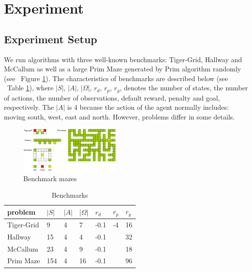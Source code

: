 \documentclass{article}
\begin{document}
\section{Experiment}

\subsection{Experiment Setup}

We run algorithms with three well-known benchmarks: Tiger-Grid, Hallway and McCallum 
as well as a large Prim Maze generated by Prim algorithm randomly
(see ~Figure \ref{fig:mazes}). The characteristics of benchmarks are described
below (see ~Table \ref{table:benchmarks}), where $|S|$, $|A|$, $|\Omega|$, $r_d$, $r_p$, $r_g$, 
denotes the number of states, the number of actions, the number of observations, default
reward, penalty and goal, respectively. The $|A|$ is 4 because the action of the agent
normally includes: moving south, west, east and north. However, problems differ in some
details.

\begin{figure}[h]
  \centering
    \includegraphics[width=0.45\textwidth]{mazes.png}
  \caption{Benchmark mazes}
  \label{fig:mazes}
\end{figure}

\begin{table}[h]
  \caption{Benchmarks}
  \label{table:benchmarks}
  \centering
  \begin{tabular}{lllllll}
    \toprule
    problem         & $|S|$          & $|A|$          & $|\Omega|$  &$r_d$  &$r_p$  &$r_g$\\
    \midrule
    Tiger-Grid      & 9              & 4              & 7           & -0.1  & -4    & 16  \\
    Hallway         & 15             & 4              & 4           & -0.1  &     & 32  \\
    McCallum        & 23             & 4              & 9           & -0.1  &     & 18  \\
    Prim Maze       & 154            & 4              & 16          & -0.1  &    & 96  \\
    \bottomrule
  \end{tabular}
\end{table}
\end{document}
